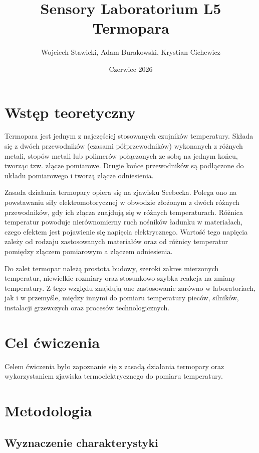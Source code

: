 \documentclass[12pt, titlepage]{article}
\title{Sensory Laboratorium L5\\
Termopara}
\author{Wojciech Stawicki, Adam Burakowski, Krystian Cichewicz}
\date{Czerwiec 2026}
\begin{document}
\maketitle
\setcounter{page}{2}

\section{Wstęp teoretyczny}

Termopara jest jednym z najczęściej stosowanych czujników temperatury. Składa się z dwóch przewodników (czasami półprzewodników) wykonanych z różnych metali, stopów metali lub polimerów połączonych ze sobą na jednym końcu, tworząc tzw. złącze pomiarowe. Drugie końce przewodników są podłączone do układu pomiarowego i tworzą złącze odniesienia.

Zasada działania termopary opiera się na zjawisku Seebecka. Polega ono na powstawaniu siły elektromotorycznej w obwodzie złożonym z dwóch różnych przewodników, gdy ich złącza znajdują się w różnych temperaturach. Różnica temperatur powoduje nierównomierny ruch nośników ładunku w materiałach, czego efektem jest pojawienie się napięcia elektrycznego. Wartość tego napięcia zależy od rodzaju zastosowanych materiałów oraz od różnicy temperatur pomiędzy złączem pomiarowym a złączem odniesienia.

Do zalet termopar należą prostota budowy, szeroki zakres mierzonych temperatur, niewielkie rozmiary oraz stosunkowo szybka reakcja na zmiany temperatury. Z tego względu znajdują one zastosowanie zarówno w laboratoriach, jak i w przemyśle, między innymi do pomiaru temperatury pieców, silników, instalacji grzewczych oraz procesów technologicznych.

\section{Cel ćwiczenia}

Celem ćwiczenia było zapoznanie się z zasadą działania termopary oraz wykorzystaniem zjawiska termoelektrycznego do pomiaru temperatury.

\section{Metodologia}

\subsection{Wyznaczenie charakterystyki}
\end{document}
